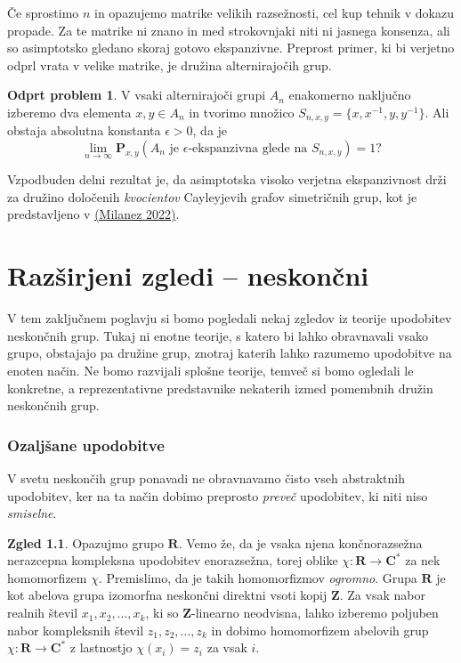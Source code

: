 \documentclass[11pt]{book}
\def\ZZ{\mathbf{Z}}
\def\RR{\mathbf{R}}
\def\CC{\mathbf{C}}
\def\PP{\mathbf{P}}
\theoremstyle{definition}
\theoremstyle{zgled}
\newtheorem*{zgled}{Zgled}
\theoremstyle{odprtproblem}
\newtheorem*{odprtproblem}{Odprt problem}
\theoremstyle{domacanaloga}
\theoremstyle{izrek}
\begin{document}
Če sprostimo $n$ in opazujemo matrike velikih razsežnosti, cel kup tehnik v dokazu propade. Za te matrike ni znano in med strokovnjaki niti ni jasnega konsenza, ali so asimptotsko gledano skoraj gotovo ekspanzivne. Preprost primer, ki bi verjetno odprl vrata v velike matrike, je družina alternirajočih grup.

\begin{odprtproblem}
V vsaki alternirajoči grupi $A_n$ enakomerno naključno izberemo dva elementa $x,y \in A_n$ in tvorimo množico $S_{n,x,y} = \{ x, x^{-1}, y, y^{-1} \}$. Ali obstaja absolutna konstanta $\epsilon > 0$, da je
\[
    \lim_{n \to \infty} \PP_{x,y}(\text{$A_n$ je $\epsilon$-ekspanzivna glede na $S_{n,x,y}$}) = 1 ?
\]
\end{odprtproblem}

Vzpodbuden delni rezultat je, da asimptotska visoko verjetna ekspanzivnost drži za družino določenih \emph{kvocientov} Cayleyjevih grafov simetričnih grup, kot je predstavljeno v \href{https://repozitorij.uni-lj.si/IzpisGradiva.php?id=140303}{(Milanez 2022)}.

\chapter{Razširjeni zgledi -- neskončni}

V tem zaključnem poglavju si bomo pogledali nekaj zgledov iz teorije upodobitev neskončnih grup. Tukaj ni enotne teorije, s katero bi lahko obravnavali vsako grupo, obstajajo pa družine grup, znotraj katerih lahko razumemo upodobitve na enoten način. Ne bomo razvijali splošne teorije, temveč si bomo ogledali le konkretne, a reprezentativne predstavnike nekaterih izmed pomembnih družin neskončnih grup.

\subsection{Ozaljšane upodobitve}

V svetu neskončih grup ponavadi ne obravnavamo čisto vseh abstraktnih upodobitev, ker na ta način dobimo preprosto \emph{preveč} upodobitev, ki niti niso \emph{smiselne}.

\begin{zgled}
Opazujmo grupo $\RR$. Vemo že, da je vsaka njena končnorazsežna nerazcepna kompleksna upodobitev enorazsežna, torej oblike $\chi \colon \RR \to \CC^*$ za nek homomorfizem $\chi$. Premislimo, da je takih homomorfizmov \emph{ogromno}. Grupa $\RR$ je kot abelova grupa izomorfna neskončni direktni vsoti kopij $\ZZ$. Za vsak nabor realnih števil $x_1, x_2, \dots, x_k$, ki so $\ZZ$-linearno neodvisna, lahko izberemo poljuben nabor kompleksnih števil $z_1, z_2, \dots, z_k$ in dobimo homomorfizem abelovih grup $\chi \colon \RR \to \CC^*$ z lastnostjo $\chi(x_i) = z_i$ za vsak $i$.
\end{zgled}
\end{document}
